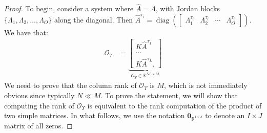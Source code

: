 \documentclass[letterpaper,12pt,peerreviewca,draftcls]{IEEEtran}
\newcommand{\R}{\mathbb{R}}
\newcommand{\empK}{\ensuremath{K}}
\newcommand{\nsamp}{N}
\newcommand{\ncent}{M}
\DeclareMathOperator{\diag}{diag}
\newcommand{\Obs}{\mathcal{O}}
\newcommand{\otime}{L}
\newcommand{\JorMul}{O}
\newcommand{\Tset}{\Upsilon}
\newcommand{\JorLa}{\Lambda}
\newcommand{\dualop}{A}
\newcommand{\dualopApprox}{\widehat{\dualop}}
\newcommand{\tindex}{\tau}
\newcommand{\zerosMat}[2]{\mathbf{0}_{\R^{#1\times#2}}}
\begin{document}
\begin{proof}
	To begin, consider a system where $\dualopApprox = \JorLa$, with Jordan blocks $\{\JorLa_1, \JorLa_2, \dots, \JorLa_{\JorMul}\}$ along the 
	diagonal. Then $\dualopApprox^{\tindex_i} = \diag(\begin{bmatrix}\JorLa_1^{\tindex_i} & \JorLa_2^{\tindex_i} & \cdots & \JorLa_{\JorMul}^{\tindex_i}\end{bmatrix})$. 
	We have that:
	\begin{align*}
	\Obs_{\Tset} &=
	\underbrace{
		\begin{bmatrix} 
		\empK \dualopApprox^{\tindex_1}\\
		\cdots\\
		\empK \dualopApprox^{\tindex_\otime}.
		\end{bmatrix}}_{\Obs_{\Tset}\in\R^{\nsamp\otime\times\ncent}}
	\end{align*}
	We need to prove that the column rank of $\Obs_{\Tset}$ is $\ncent$, which is not immediately
	obvious since typically $\nsamp \ll \ncent$. To prove the statement, we will show that 
	computing the rank of $\Obs_{\Tset}$ is equivalent to the rank computation of the product of 
	two simple matrices. In what follows,
	we use the notation $\zerosMat{I}{J}$ to denote an $I\times J$ matrix of all zeros. 
	

\end{proof}
\end{document}

